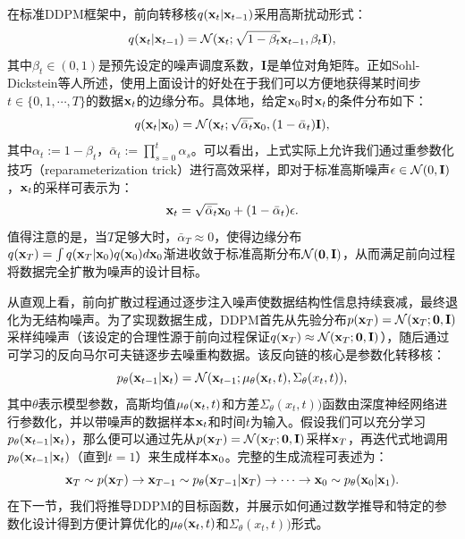\documentclass[11pt,a4paper,UTF8]{ctexart}
\begin{document}
在标准DDPM框架中，前向转移核$q(\mathbf{x}_t|\mathbf{x}_{t-1})$采用高斯扰动形式：
\begin{equation}
    q(\mathbf{x}_t|\mathbf{x}_{t-1}) =\mathcal{N}(\mathbf{x}_t;\sqrt{1-\beta_t}\mathbf{x}_{t-1},\beta_t\mathbf{I}),
\label{ddpm:forward_process}
\end{equation}
其中$\beta_t\in(0,1)$是预先设定的噪声调度系数，$\mathbf{I}$是单位对角矩阵。正如Sohl-Dickstein等人\cite{sohldickstein2015diffusion}所述，使用上面设计的好处在于我们可以方便地获得某时间步$t\in\{0,1,\cdots,T\}$的数据$\mathbf{x}_t$的边缘分布。具体地，给定$\mathbf{x}_0$时$\mathbf{x}_t$的条件分布如下：
\begin{equation}
    q(\mathbf{x}_t|\mathbf{x}_0)=\mathcal{N}(\mathbf{x}_t;\sqrt{\bar{\alpha}_t}\mathbf{x}_0,(1-\bar{\alpha}_t)\mathbf{I}),
\label{ddpm:bar_alpha}
\end{equation}
其中$\alpha_t:=1-\beta_t$，$\bar{\alpha}_t:=\prod_{s=0}^t\alpha_s$。可以看出，上式实际上允许我们通过重参数化技巧（reparameterization trick）进行高效采样，即对于标准高斯噪声$\epsilon\in\mathcal{N}(0,\mathbf{I})$，$\mathbf{x}_t$的采样可表示为：
\begin{equation*}
    \mathbf{x}_t=\sqrt{\bar{\alpha}_t}\mathbf{x}_0 + (1-\bar{\alpha}_t)\epsilon.
\end{equation*}
值得注意的是，当$T$足够大时，$\bar{\alpha}_T\approx 0$，使得边缘分布$q(\mathbf{x}_T)=\int q(\mathbf{x}_T|\mathbf{x}_0)q(\mathbf{x}_0)d\mathbf{x}_0$渐进收敛于标准高斯分布$\mathcal{N}(\mathbf{0},\mathbf{I})$，从而满足前向过程将数据完全扩散为噪声的设计目标。

从直观上看，前向扩散过程通过逐步注入噪声使数据结构性信息持续衰减，最终退化为无结构噪声。为了实现数据生成，DDPM首先从先验分布$p(\mathbf{x}_T)=\mathcal{N}(\mathbf{x}_T;\mathbf{0},\mathbf{I})$采样纯噪声（该设定的合理性源于前向过程保证$q(\mathbf{x}_T) \approx \mathcal{N}(\mathbf{x}_T; \mathbf{0}, \mathbf{I})$），随后通过可学习的反向马尔可夫链逐步去噪重构数据。该反向链的核心是参数化转移核：
\begin{equation}
    p_{\theta}(\mathbf{x}_{t-1}|\mathbf{x}_t) = \mathcal{N}(\mathbf{x}_{t-1};\mu_{\theta}(\mathbf{x}_t,t),\Sigma_{\theta}(x_t,t)),
\label{ddpm:reverse_gaussian}
\end{equation}
其中$\theta$表示模型参数，高斯均值$\mu_{\theta}(\mathbf{x}_t,t)$和方差$\Sigma_{\theta}(x_t,t))$函数由深度神经网络进行参数化，并以带噪声的数据样本$\mathbf{x}_t$和时间$t$为输入。假设我们可以充分学习$p_{\theta}(\mathbf{x}_{t-1}|\mathbf{x}_t)$，那么便可以通过先从$p(\mathbf{x}_T)=\mathcal{N}(\mathbf{x}_T;\mathbf{0},\mathbf{I})$采样$\mathbf{x}_T$，再迭代式地调用$p_{\theta}(\mathbf{x}_{t-1}|\mathbf{x}_t)$（直到$t=1$）来生成样本$\mathbf{x}_0$。完整的生成流程可表述为：
\begin{equation*}
\mathbf{x}_T \sim p(\mathbf{x}_T) \rightarrow \mathbf{x}_{T-1} \sim p_{\theta}(\mathbf{x}_{T-1}|\mathbf{x}_T) \rightarrow \cdots \rightarrow \mathbf{x}_0 \sim p_{\theta}(\mathbf{x}_0|\mathbf{x}_1).
\end{equation*}
在下一节，我们将推导DDPM的目标函数，并展示如何通过数学推导和特定的参数化设计得到方便计算优化的$\mu_{\theta}(\mathbf{x}_t,t)$和$\Sigma_{\theta}(x_t,t))$形式。
\end{document}
